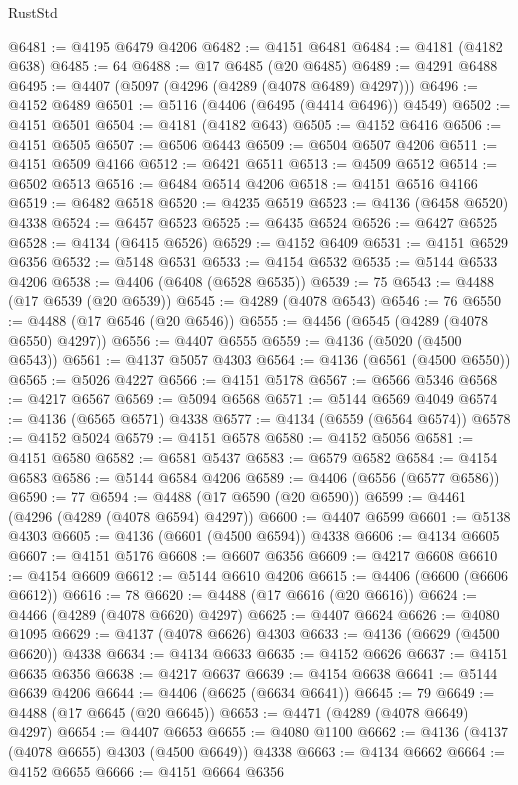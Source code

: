 \begin{lexlean}{RustStd}
\begin{coremodule}
@6481 := @4195 @6479 @4206
@6482 := @4151 @6481
@6484 := @4181 (@4182 @638)
@6485 := 64
@6488 := @17 @6485 (@20 @6485)
@6489 := @4291 @6488
@6495 := @4407 (@5097 (@4296 (@4289 (@4078 @6489) @4297)))
@6496 := @4152 @6489
@6501 := @5116 (@4406 (@6495 (@4414 @6496)) @4549)
@6502 := @4151 @6501
@6504 := @4181 (@4182 @643)
@6505 := @4152 @6416
@6506 := @4151 @6505
@6507 := @6506 @6443
@6509 := @6504 @6507 @4206
@6511 := @4151 @6509 @4166
@6512 := @6421 @6511
@6513 := @4509 @6512
@6514 := @6502 @6513
@6516 := @6484 @6514 @4206
@6518 := @4151 @6516 @4166
@6519 := @6482 @6518
@6520 := @4235 @6519
@6523 := @4136 (@6458 @6520) @4338
@6524 := @6457 @6523
@6525 := @6435 @6524
@6526 := @6427 @6525
@6528 := @4134 (@6415 @6526)
@6529 := @4152 @6409
@6531 := @4151 @6529 @6356
@6532 := @5148 @6531
@6533 := @4154 @6532
@6535 := @5144 @6533 @4206
@6538 := @4406 (@6408 (@6528 @6535))
@6539 := 75
@6543 := @4488 (@17 @6539 (@20 @6539))
@6545 := @4289 (@4078 @6543)
@6546 := 76
@6550 := @4488 (@17 @6546 (@20 @6546))
@6555 := @4456 (@6545 (@4289 (@4078 @6550) @4297))
@6556 := @4407 @6555
@6559 := @4136 (@5020 (@4500 @6543))
@6561 := @4137 @5057 @4303
@6564 := @4136 (@6561 (@4500 @6550))
@6565 := @5026 @4227
@6566 := @4151 @5178
@6567 := @6566 @5346
@6568 := @4217 @6567
@6569 := @5094 @6568
@6571 := @5144 @6569 @4049
@6574 := @4136 (@6565 @6571) @4338
@6577 := @4134 (@6559 (@6564 @6574))
@6578 := @4152 @5024
@6579 := @4151 @6578
@6580 := @4152 @5056
@6581 := @4151 @6580
@6582 := @6581 @5437
@6583 := @6579 @6582
@6584 := @4154 @6583
@6586 := @5144 @6584 @4206
@6589 := @4406 (@6556 (@6577 @6586))
@6590 := 77
@6594 := @4488 (@17 @6590 (@20 @6590))
@6599 := @4461 (@4296 (@4289 (@4078 @6594) @4297))
@6600 := @4407 @6599
@6601 := @5138 @4303
@6605 := @4136 (@6601 (@4500 @6594)) @4338
@6606 := @4134 @6605
@6607 := @4151 @5176
@6608 := @6607 @6356
@6609 := @4217 @6608
@6610 := @4154 @6609
@6612 := @5144 @6610 @4206
@6615 := @4406 (@6600 (@6606 @6612))
@6616 := 78
@6620 := @4488 (@17 @6616 (@20 @6616))
@6624 := @4466 (@4289 (@4078 @6620) @4297)
@6625 := @4407 @6624
@6626 := @4080 @1095
@6629 := @4137 (@4078 @6626) @4303
@6633 := @4136 (@6629 (@4500 @6620)) @4338
@6634 := @4134 @6633
@6635 := @4152 @6626
@6637 := @4151 @6635 @6356
@6638 := @4217 @6637
@6639 := @4154 @6638
@6641 := @5144 @6639 @4206
@6644 := @4406 (@6625 (@6634 @6641))
@6645 := 79
@6649 := @4488 (@17 @6645 (@20 @6645))
@6653 := @4471 (@4289 (@4078 @6649) @4297)
@6654 := @4407 @6653
@6655 := @4080 @1100
@6662 := @4136 (@4137 (@4078 @6655) @4303 (@4500 @6649)) @4338
@6663 := @4134 @6662
@6664 := @4152 @6655
@6666 := @4151 @6664 @6356

\end{coremodule}
\end{lexlean}
